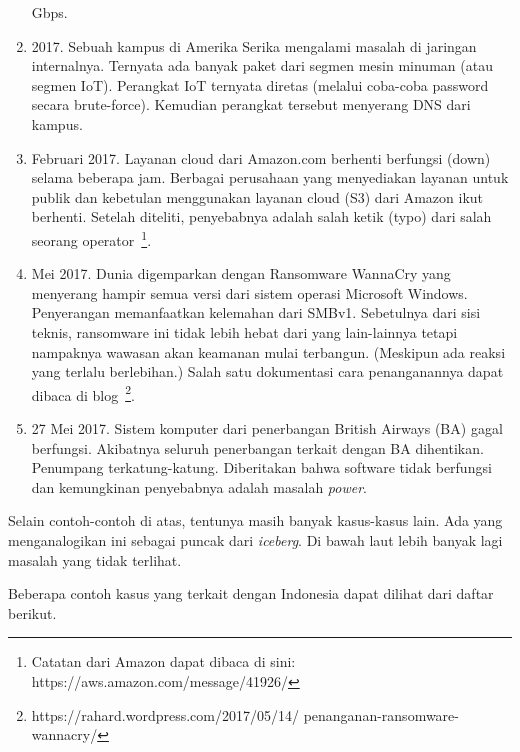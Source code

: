 \begin{enumerate}
   Gbps.
\item 2017.
   Sebuah kampus di Amerika Serika mengalami masalah di jaringan internalnya.
      Ternyata ada banyak paket dari segmen mesin minuman (atau segmen IoT).
      Perangkat IoT ternyata diretas (melalui coba-coba password secara
      brute-force). Kemudian perangkat tersebut menyerang DNS dari kampus.
\item Februari 2017. 
   Layanan cloud dari Amazon.com berhenti berfungsi (down) selama beberapa jam.
      Berbagai perusahaan yang menyediakan layanan untuk publik dan kebetulan
      menggunakan layanan cloud (S3) dari Amazon ikut berhenti. Setelah
      diteliti, penyebabnya adalah salah ketik (typo) dari salah seorang
      operator~\footnote{Catatan dari Amazon dapat dibaca di sini: https://aws.amazon.com/message/41926/}.
   \item Mei 2017. Dunia digemparkan dengan Ransomware WannaCry yang menyerang
      hampir semua versi dari sistem operasi Microsoft Windows. Penyerangan
      memanfaatkan kelemahan dari SMBv1. Sebetulnya dari sisi teknis,
      ransomware ini tidak lebih hebat dari yang lain-lainnya tetapi nampaknya
      wawasan akan keamanan mulai terbangun. (Meskipun ada reaksi yang terlalu
      berlebihan.) Salah satu dokumentasi cara penanganannya dapat dibaca di
      blog~\cite{brwannacry}\footnote{https://rahard.wordpress.com/2017/05/14/
      penanganan-ransomware-wannacry/}.
\item 27 Mei 2017. Sistem komputer dari penerbangan British Airways (BA) gagal
   berfungsi. Akibatnya seluruh penerbangan terkait dengan BA dihentikan.
      Penumpang terkatung-katung. Diberitakan bahwa software tidak berfungsi
      dan kemungkinan penyebabnya adalah masalah {\em power}.
\end{enumerate}

Selain contoh-contoh di atas, tentunya masih banyak kasus-kasus lain.
Ada yang menganalogikan ini sebagai puncak dari {\em iceberg}.
Di bawah laut lebih banyak lagi masalah yang tidak terlihat.

Beberapa contoh kasus yang terkait dengan Indonesia dapat
dilihat dari daftar berikut.

